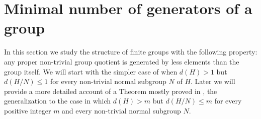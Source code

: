 \chapter{Minimal number of generators of a group}

In this section we study the structure of finite groups with the following property: any proper non-trivial group quotient is generated by less elements than the group itself. 
We will start with the simpler case of when $d(H) > 1$ but $d(H/N) \le 1$ for every non-trivial normal subgroup $N$ of $H$. 
Later we will provide a more detailed account of a Theorem mostly proved in \cite{DallaVoltaFGNMGAPQ}, the generalization to the case in which $d(H) > m$ but $d(H/N) \le m$ for every positive integer $m$ and every non-trivial normal subgroup $N$.



